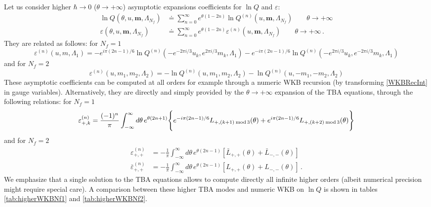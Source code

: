 \documentclass[11pt,a4paper]{elsarticle}
\def \th {\theta}
\def \ve {\varepsilon}
\def \ba {\begin{aligned}}
\def \ea {\end{aligned}}
\newcommand{\be}{\begin{equation}}
\newcommand{\ee}{\end{equation}}
\def\th{\theta}
\numberwithin{figure}{section}
\numberwithin{table}{section}
\begin{document}
Let us consider higher $\hbar\to 0$ ($\theta\to + \infty$) asymptotic expansions coefficients for $\ln Q$ and $\varepsilon$:
\be 
\ba 
\ln Q (\th,u,\mathbf m,\Lambda_{N_f}) &\doteq \sum_{n=0}^\infty e^{\th(1-2n)} \ln Q^{(n)}(u,\mathbf{m},\Lambda_{N_f}) \qquad \th \to +\infty \\
\varepsilon (\th,u,\mathbf m,\Lambda_{N_f}) &\doteq \sum_{n=0}^\infty e^{\th(1-2n)} \varepsilon^{(n)}(u,\mathbf{m},\Lambda_{N_f}) \qquad \th \to +\infty \,.
\ea 
\ee 
They are related as follows: for $N_f=1$
\be
\varepsilon^{(n)}(u,m,\Lambda_1)= -e^{i\pi(2n-1)/6} \ln Q^{(n)}(-e^{-2\pi i/3}u_k,e^{2\pi i/3}m_k,\Lambda_1) -e^{-i\pi(2n-1)/6} \ln Q^{(n)}(-e^{2\pi i/3}u_k,e^{-2\pi i/3}m_k,\Lambda_1)  
\ee
and for $N_f=2$
\be
\varepsilon^{(n)}(u,m_1,m_2,\Lambda_2) = - \ln Q^{(n)}(u,m_1,m_2,\Lambda_2) - \ln Q^{(n)}(u,-m_1,-m_2,\Lambda_2)
\ee
These asymptotic coefficients can be computed at all orders for example through a numeric WKB recursion (by transforming \eqref{WKBRecInt} in gauge variables). Alternatively, they are directly and simply provided by the $\theta \to + \infty$ expansion of the TBA equations, through the following relations: for $N_f=1$
\be \label{tbaModesNf1}
\ve^{(n)}_{+,k}=\frac{(-1)^n}{\pi} \int_{-\infty}^\infty d \th \,e^{\th(2n+1)} \Biggl \{e^{-i\pi(2n-1)/6} L_{+,(k+1)\:{\rm mod}\,3}(\th)+e^{i\pi(2n-1)/6}L_{+,(k+2)\:{\rm mod}\,3}(\th) \Biggr \}
\ee
and for $N_f=2$
\be 
\ba \label{tbaModesNf2}
\varepsilon_{+,+}^{(n)} &=-\frac{1}{\pi} \int_{-\infty}^\infty d \th\, e^{\th(2n-1)} \left[ \bar{L}_{+,+}(\th)+\bar{L}_{-,-}(\th)\right]\\
\bar{\varepsilon}_{+,+}^{(n)} &=-\frac{1}{\pi} \int_{-\infty}^\infty d \th\, e^{\th(2n-1)} \left[ L_{+,+}(\th)+L_{-,-}(\th)\right]\,.
\ea
\ee
We emphasize that a single solution to the TBA equations allows to compute directly all infinite higher orders (albeit numerical precision might require special care). A comparison between these higher TBA modes and numeric WKB on $\ln Q$ is shown in tables \ref{tab:higherWKBNf1} and \ref{tab:higherWKBNf2}.
\end{document}
